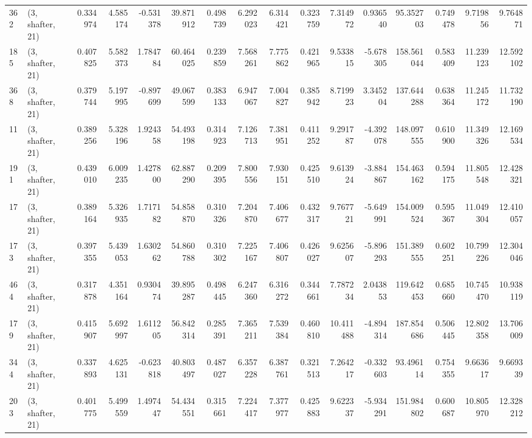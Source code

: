\begin{tabular}{llrrrrrrrrrrrrrr}
362 &  (3, shafter, 21) &   0.334974 &   4.585174 &  -0.531378 &    39.871912 &   0.498739 &   6.292023 &   6.314421 &  0.323759 &   7.314972 &   0.936540 &    95.352703 &   0.749478 &   9.719856 &   9.764871 \\
185 &  (3, shafter, 21) &   0.407825 &   5.582373 &   1.784784 &    60.464025 &   0.239859 &   7.568261 &   7.775862 &  0.421965 &   9.533815 &  -5.678305 &   158.561044 &   0.583409 &  11.239123 &  12.592102 \\
368 &  (3, shafter, 21) &   0.379744 &   5.197995 &  -0.897699 &    49.067599 &   0.383133 &   6.947067 &   7.004827 &  0.385942 &   8.719923 &   3.345204 &   137.644288 &   0.638364 &  11.245172 &  11.732190 \\
11  &  (3, shafter, 21) &   0.389256 &   5.328196 &   1.924358 &    54.493198 &   0.314923 &   7.126713 &   7.381951 &  0.411252 &   9.291787 &  -4.392078 &   148.097555 &   0.610900 &  11.349326 &  12.169534 \\
191 &  (3, shafter, 21) &   0.439010 &   6.009235 &   1.427800 &    62.887290 &   0.209395 &   7.800556 &   7.930151 &  0.425510 &   9.613924 &  -3.884867 &   154.463162 &   0.594175 &  11.805548 &  12.428321 \\
17  &  (3, shafter, 21) &   0.389164 &   5.326935 &   1.717182 &    54.858870 &   0.310326 &   7.204870 &   7.406677 &  0.432317 &   9.767721 &  -5.649991 &   154.009524 &   0.595367 &  11.049304 &  12.410057 \\
173 &  (3, shafter, 21) &   0.397355 &   5.439053 &   1.630262 &    54.860788 &   0.310302 &   7.225167 &   7.406807 &  0.426027 &   9.625607 &  -5.896293 &   151.389555 &   0.602251 &  10.799226 &  12.304046 \\
464 &  (3, shafter, 21) &   0.317878 &   4.351164 &   0.930474 &    39.895287 &   0.498445 &   6.247360 &   6.316272 &  0.344661 &   7.787234 &   2.043853 &   119.642453 &   0.685660 &  10.745470 &  10.938119 \\
179 &  (3, shafter, 21) &   0.415907 &   5.692997 &   1.611205 &    56.842314 &   0.285391 &   7.365211 &   7.539384 &  0.460810 &  10.411488 &  -4.894314 &   187.854686 &   0.506445 &  12.802358 &  13.706009 \\
344 &  (3, shafter, 21) &   0.337893 &   4.625131 &  -0.623818 &    40.803497 &   0.487027 &   6.357228 &   6.387761 &  0.321513 &   7.264217 &  -0.332603 &    93.496114 &   0.754355 &   9.663617 &   9.669339 \\
203 &  (3, shafter, 21) &   0.401775 &   5.499559 &   1.497447 &    54.434551 &   0.315661 &   7.224417 &   7.377977 &  0.425883 &   9.622337 &  -5.934291 &   151.984802 &   0.600687 &  10.805970 &  12.328212 \\

\end{tabular}
